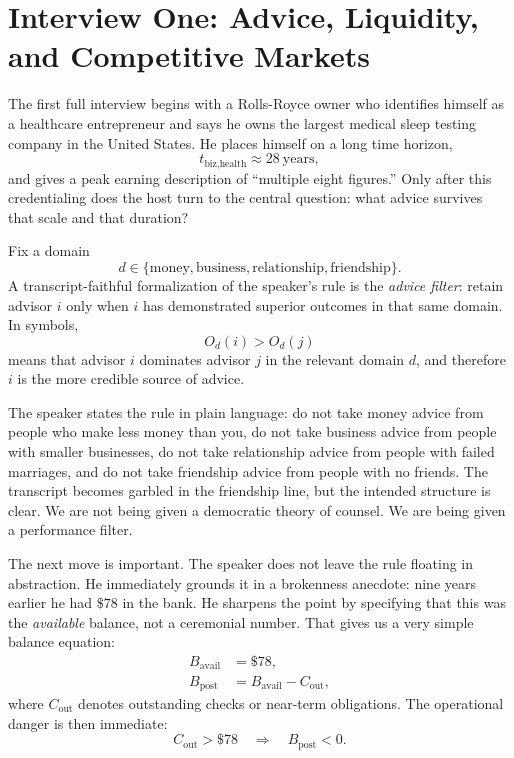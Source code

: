 \section{Interview One: Advice, Liquidity, and Competitive Markets}

The first full interview begins with a Rolls-Royce owner who identifies himself as a healthcare entrepreneur and says he owns the largest medical sleep testing company in the United States. He places himself on a long time horizon,
\[
t_{\text{biz,health}} \approx 28\ \text{years},
\]
and gives a peak earning description of ``multiple eight figures.'' Only after this credentialing does the host turn to the central question: what advice survives that scale and that duration?

\begin{definition}
Fix a domain
\[
d \in \{\text{money},\text{business},\text{relationship},\text{friendship}\}.
\]
A transcript-faithful formalization of the speaker's rule is the \emph{advice filter}: retain advisor \(i\) only when \(i\) has demonstrated superior outcomes in that same domain. In symbols,
\begin{equation}
O_d(i) > O_d(j)
\end{equation}
means that advisor \(i\) dominates advisor \(j\) in the relevant domain \(d\), and therefore \(i\) is the more credible source of advice.
\end{definition}

The speaker states the rule in plain language: do not take money advice from people who make less money than you, do not take business advice from people with smaller businesses, do not take relationship advice from people with failed marriages, and do not take friendship advice from people with no friends. The transcript becomes garbled in the friendship line, but the intended structure is clear. We are not being given a democratic theory of counsel. We are being given a performance filter.

The next move is important. The speaker does not leave the rule floating in abstraction. He immediately grounds it in a brokenness anecdote: nine years earlier he had \(\text{\$}78\) in the bank. He sharpens the point by specifying that this was the \emph{available} balance, not a ceremonial number. That gives us a very simple balance equation:
\begin{align}
B_{\text{avail}} &= \text{\$}78,\\
B_{\text{post}} &= B_{\text{avail}} - C_{\text{out}},
\end{align}
where \(C_{\text{out}}\) denotes outstanding checks or near-term obligations. The operational danger is then immediate:
\begin{equation}
C_{\text{out}} > \text{\$}78 \quad \Rightarrow \quad B_{\text{post}} < 0.
\end{equation}

